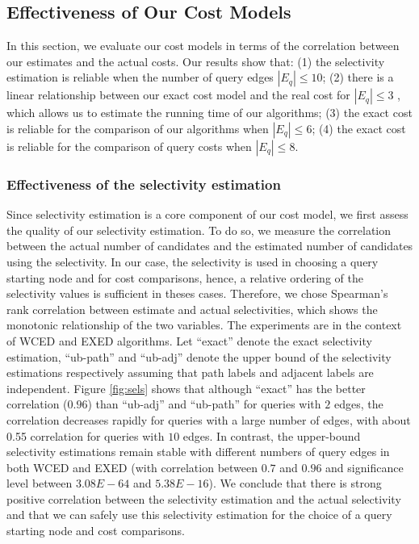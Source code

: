 \documentclass{sigmod}
\begin{document}
\subsection{Effectiveness of Our Cost Models}
\label{sec:cost}
In this section, we evaluate our cost models in terms of the correlation between our estimates and the actual costs. Our results show that: (1) the selectivity estimation is reliable when the number of query edges $|E_q| \leq 10$; (2) there is a linear relationship between our exact cost model and the real cost for $|E_q| \leq 3$ , which allows us to estimate the running time of our algorithms; (3) the exact cost is reliable for the comparison of our algorithms when $|E_q| \leq 6$; (4) the exact cost is reliable for the comparison of query costs when $|E_q| \leq 8$. 

\subsubsection{Effectiveness of the selectivity estimation}
Since selectivity estimation is a core component of our cost model, we first assess the quality of our selectivity estimation. To do so, we measure the correlation between the actual number of candidates and the estimated number of candidates using the selectivity. In our case, the selectivity is  used in choosing a query starting node and for cost comparisons, hence, a relative ordering of the selectivity values is sufficient in theses cases. Therefore, we chose Spearman's rank correlation between estimate and actual selectivities, which shows the monotonic relationship of the two variables. The experiments are in the context of  WCED and EXED algorithms. Let ``exact'' denote the exact selectivity estimation, ``ub-path'' and ``ub-adj'' denote the upper bound of the selectivity estimations respectively assuming that path labels and adjacent labels are independent. Figure \ref{fig:sels} shows that although ``exact'' has the better correlation ($0.96$) than ``ub-adj'' and ``ub-path'' for queries with $2$ edges, the correlation decreases rapidly for queries with a large number of edges, with about 0.55 correlation for queries with $10$ edges. In contrast, the upper-bound selectivity estimations remain stable with different numbers of query edges in both WCED and EXED (with correlation between $0.7$ and $0.96$ and significance level between $3.08E-64$ and $5.38E-16$).  We conclude that there is strong positive correlation between the selectivity estimation and the actual selectivity and that we can safely use this selectivity estimation for the choice of a query starting node and cost comparisons.
\end{document}

